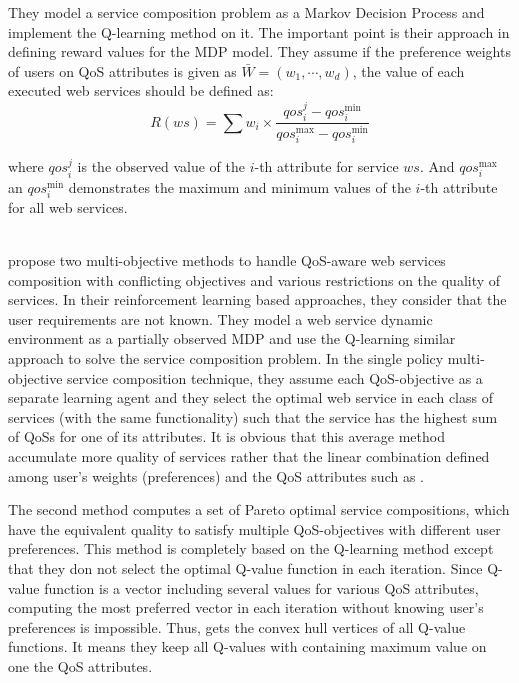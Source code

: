 \documentclass[10pt,journal,compsoc]{IEEEtran}
\begin{document}
They model a service composition problem as a Markov Decision Process and implement the Q-learning method on it. The important point is their approach in defining reward values for the MDP model. They assume if the preference weights of users on QoS attributes is given as $\bar{W} = (w_1, \cdots, w_d)$, the value of each executed web services should be defined as: 
\begin{equation}
R(ws) = \sum w_i \times \frac{qos_i^j - qos_i^{\text{min}}}{qos_i^{\text{max}}-qos_i^{\text{min}}}
\end{equation}

where $qos_i^j$ is the observed value of the $i$-th attribute for service $ws$. And $qos_i^{\text{max}}$ an $qos_i^{\text{min}}$ demonstrates the maximum and minimum values of the $i$-th attribute for all web services.


 \cite{Mostafa2015}  \\
 \cite{Mostafa2015} propose two multi-objective methods to handle QoS-aware web services composition with conflicting objectives and various restrictions on the quality of services. In their reinforcement learning based approaches, they consider that the user requirements are not known. They model a web service dynamic environment as a partially observed MDP and use the Q-learning similar approach to solve the service composition problem. In the single policy multi-objective service composition technique, they assume each QoS-objective as a separate learning agent and they select the optimal web service in each class of services (with the same functionality) such that the service has the highest sum of QoSs for one of its attributes. It is obvious that this average method accumulate more quality of services rather that the linear combination defined among user's weights (preferences) and the QoS attributes such as \cite{Wang2010}. 
 
 The second method computes a set of Pareto optimal service compositions, which have the equivalent quality to satisfy multiple QoS-objectives with different user preferences. This method is completely based on the Q-learning method except that they don not select the optimal Q-value function in each iteration. Since Q-value function is a vector including several values for various QoS attributes, computing the most preferred vector in each iteration without knowing user's preferences is impossible. Thus,  \cite{Mostafa2015} gets the convex hull vertices of all Q-value functions. It means they keep all Q-values with containing maximum value on one the QoS attributes. 
\end{document}
